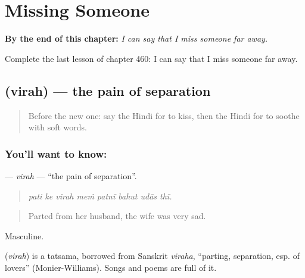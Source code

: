
\chapter{Missing Someone}
\label{ch:hi-missing-someone}

\begin{chapteropening}
\textbf{By the end of this chapter:} \emph{I can say that I miss someone far away.}

Complete the last lesson of chapter 460: I can say that I miss someone far away.
\end{chapteropening}

\section[\texorpdfstring{\hi{विरह} (virah)}{विरह (virah)}]{ (virah) — the pain of separation}

\label{lesson:HI-C460-virah}



\begin{quote}
Before the new one: say the Hindi for to kiss, then the Hindi for to soothe with soft words.
\end{quote}

\subsection*{You'll want to know: }
\textbf{} — \emph{virah} — \textquotedblleft{}the pain of separation\textquotedblright{}.

\begin{quote}
       
\end{quote}

\begin{quote}
\emph{pati ke virah meṁ patnī bahut udās thī.}
\end{quote}

\begin{quote}
Parted from her husband, the wife was very sad.
\end{quote}

Masculine.

\begin{cousinweb}
\textbf{} (\emph{virah}) is a tatsama, borrowed from Sanskrit \emph{viraha}, \textquotedblleft{}parting, separation, esp. of lovers\textquotedblright{} (Monier-Williams). Songs and poems are full of it.
\end{cousinweb}

